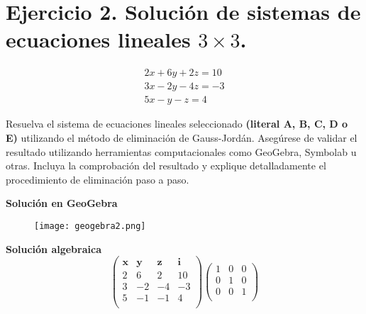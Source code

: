 
\section{\large Ejercicio 2. Solución de sistemas de ecuaciones lineales $3\times3$.}

\[
    \begin{aligned}
        2x+6y+2z=10\\
        3x-2y-4z=-3 \\
        5x-y-z=4
    \end{aligned}
\]

Resuelva el sistema de ecuaciones lineales seleccionado \textbf{(literal A, B, C, D o E)} utilizando el método de eliminación de Gauss-Jordán. Asegúrese de validar el resultado utilizando herramientas computacionales como GeoGebra, Symbolab u otras. Incluya la comprobación del resultado y explique detalladamente el procedimiento de eliminación paso a paso.

\textbf{Solución en GeoGebra}
\begin{figure}[ht!]
    \centering
    \texttt{[image: geogebra2.png]}
\end{figure}

\textbf{Solución algebraica}
\[
    \left(
        \begin{array}{ccc|c}
            \textbf{x} & \textbf{y} & \textbf{z} & \textbf{i} \\
            2 & 6 & 2 & 10 \\
            3 & -2 & -4 & -3 \\
            5 & -1 & -1 & 4 \\
        \end{array}
    \right)
    \begin{pmatrix}
        1 & 0 & 0 \\
        0 & 1 & 0 \\
        0 & 0 & 1 \\
    \end{pmatrix}
\]

